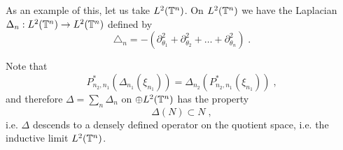 \documentclass[12pt]{article}
\newcommand{\bbT}{{\Bbb T}}
\begin{document}
As an example of this, let us take \raisebox{-1.3ex}{ $\stackrel{\displaystyle{\lim}}{\to}$}$ L^2(\bbT^n)$. On $L^2(\bbT^n)$ we have the Laplacian $\Delta_n:L^2(\bbT^n)\to L^2(\bbT^n)$ defined by
$$\triangle_n=-(\partial^2_{\theta_1} +\partial^2_{\theta_2}+\ldots +\partial^2_{\theta_n})\;.$$ 

Note that 
$$P^*_{n_2,n_1}(\Delta_{n_1}(\xi_{n_1}))=\Delta_{n_2}(P^*_{n_2,n_1}(\xi_{n_1}))\;,$$
and therefore $\Delta=\sum_n\Delta_n$ on $\oplus L^2(\bbT^n)$ has the property 
$$\Delta (N)\subset N\;,$$
i.e. $\Delta$ descends to  a densely defined operator on the quotient space, i.e. the inductive limit \raisebox{-1.3ex}{ $\stackrel{\displaystyle{\lim}}{\to}$}$ L^2(\bbT^n)$. 














 
\end{document}
